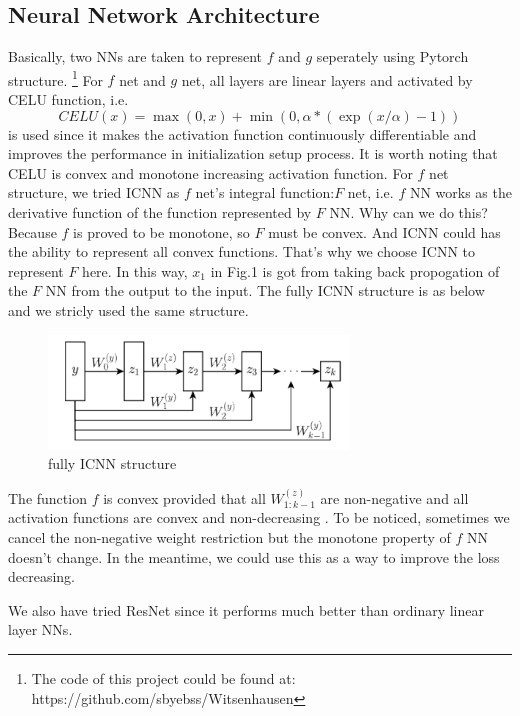 \documentclass[conference,compsoc]{IEEEtran}
\begin{document}
\subsection{Neural Network Architecture}
 Basically, two NNs are taken to represent $f$ and $g$ seperately using Pytorch structure. \footnote{The code of this project could be found at: https://github.com/sbyebss/Witsenhausen}
For $f$ net and $g$ net, all layers are linear layers and activated by CELU\cite{barron2017continuously} function, i.e. 
\begin{equation}
  CELU(x)=\max(0,x)+\min(0,\alpha*(\exp(x/\alpha)-1))
\end{equation}
is used since it makes the activation function continuously differentiable and improves the performance in initialization setup process. It is worth noting that CELU is convex and monotone increasing activation function.
For $f$ net structure, we tried ICNN as $f$ net's integral function:$F$ net, i.e. $f$ NN works as the derivative function of the function represented by $F$ NN. Why can we do this? Because $f$ is proved to be monotone, so $F$ must be convex. And ICNN could has the ability to represent all convex functions. That's why we choose ICNN to represent $F$ here. In this way, $x_1$ in Fig.1 is got from taking back propogation of the $F$ NN from the output to the input. The fully ICNN structure is as below and we stricly used the same structure.
\begin{figure}[htp]
  \centering
  \includegraphics[width=8cm]{images/ICNN.png}
  \caption{fully ICNN structure}
  \label{fig:definition}
\end{figure}

The function $f$ is convex provided that all $W_{1:k-1}^{(z)}$ are non-negative and all activation functions are convex and non-decreasing \cite{amos2017input}. To be noticed, sometimes we cancel the non-negative weight restriction but the monotone property of $f$ NN doesn't change. In the meantime, we could use this as a way to improve the loss decreasing.

We also have tried ResNet\cite{he2016deep} since it performs much better than ordinary linear layer NNs. 
\end{document}
